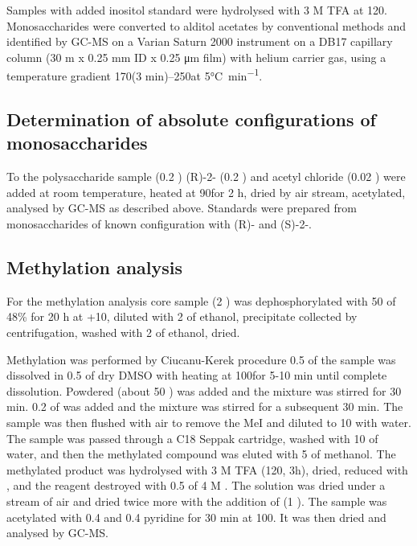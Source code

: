 		Samples with added inositol standard were hydrolysed with 3 M \ac{TFA} at 120\cel. Monosaccharides were converted to alditol acetates by conventional methods and identified by \ac{GC-MS} on a Varian Saturn 2000 instrument on a DB17 capillary column (30 m x 0.25 \si{\milli\meter} ID x 0.25 \si{\micro\meter} film) with helium carrier gas, using a temperature gradient 170\cel (3 min)--250\cel at 5\si{\degreeCelsius\per\minute}.

	\subsection{Determination of absolute configurations of monosaccharides} %
	\label{sub:determination_of_absolute_configurations_of_monosaccharides}

		To the polysaccharide sample (0.2 \milligram) (R)-2- (0.2 \millilitre) and acetyl chloride (0.02 \millilitre) were added at room temperature, heated at 90\cel for 2 h, dried by air stream, acetylated, analysed by \ac{GC-MS} as described above. Standards were prepared from monosaccharides of known configuration with (R)- and (S)-2-.

	\subsection{Methylation analysis} %
	\label{sub:methylation_analysis}

		For the methylation analysis core sample (2 \milligram) was dephosphorylated with 50 \microlitre of 48\%  for 20 h at +10\cel, diluted with 2 \millilitre of ethanol, precipitate collected by centrifugation, washed with 2 \millilitre of ethanol, dried.

		Methylation was performed by Ciucanu-Kerek procedure 0.5 \milligram of the sample was dissolved in 0.5 \millilitre of dry DMSO with heating at 100\cel for 5-10 min until complete dissolution. Powdered  (about 50 \milligram) was added and the mixture was stirred for 30 min. 0.2 \millilitre of  was added and the mixture was stirred for a subsequent 30 min. The sample was then flushed with air to remove the MeI and diluted to 10 \millilitre with water. The sample was passed through a C18 Seppak cartridge, washed with 10 \millilitre of water, and then the methylated compound was eluted with 5 \millilitre of methanol. The methylated product was hydrolysed with 3 M \ac{TFA} (120\cel, 3h), dried, reduced with , and the reagent destroyed with 0.5 \millilitre of 4 M . The solution was dried under a stream of air and dried twice more with the addition of  (1 \millilitre). The sample was acetylated with 0.4 \millilitre{}  and 0.4 \millilitre pyridine for 30 min at 100\cel. It was then dried and analysed by \ac{GC-MS}.

